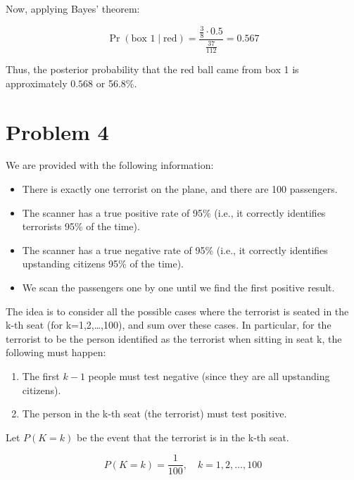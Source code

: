 \documentclass[12pt]{report}
\begin{document}
Now, applying Bayes' theorem:

\[
\Pr(\text{box 1} \mid \text{red}) = \frac{\frac{3}{8} \cdot 0.5}{\frac{37}{112}} = 0.567
\]

Thus, the posterior probability that the red ball came from box 1 is approximately \( 0.568 \) or 56.8\%.



\section*{Problem 4}

We are provided with the following information:

\begin{itemize}
    \item There is exactly one terrorist on the plane, and there are 100 passengers.
    \item The scanner has a true positive rate of 95\% (i.e., it correctly identifies terrorists 95\% of the time).
    \item The scanner has a true negative rate of 95\% (i.e., it correctly identifies upstanding citizens 95\% of the time).
    \item We scan the passengers one by one until we find the first positive result.
\end{itemize}



The idea is to consider all the possible cases where the terrorist is seated in the k-th seat (for k=1,2,…,100), and sum over these cases. In particular, for the terrorist to be the person identified as the terrorist when sitting in seat k, the following must happen:

\begin{enumerate}
    \item The first $k-1$ people must test negative (since they are all upstanding citizens).
    \item The person in the k-th seat (the terrorist) must test positive.
\end{enumerate}

Let $P(K=k)$ be the event that the terrorist is in the k-th seat.

\begin{equation*}
P(K=k) = \frac{1}{100}, \quad k = 1, 2, \dots, 100
\end{equation*}
\end{document}
